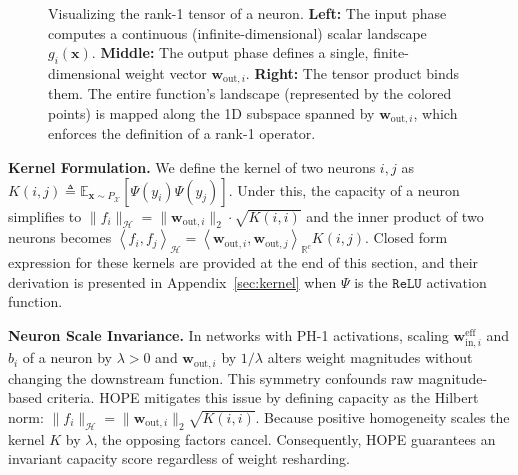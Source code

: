 \documentclass[11pt, a4paper, copyright, gdm]{google}
\newcommand{\normshort}[1]{\lVert#1\rVert}
\newcommand{\inner}[2]{\left\langle#1, #2\right\rangle}
\newcommand{\wVect}{\boldsymbol{w}}
\newcommand{\xVect}{\boldsymbol{x}}
\newcommand{\calH}{\mathcal{H}}
\newcommand{\calX}{\mathcal{X}}
\newcommand{\R}{\mathbb{R}}
\newcommand{\E}{\mathbb{E}}
\newcommand{\ReLU}{\texttt{ReLU}\xspace}
\theoremstyle{definition}
\begin{document}
\begin{figure}[tb]
{
    }
    \caption{\small Visualizing the rank-1 tensor of a neuron. \textbf{Left:} The input phase computes a continuous (infinite-dimensional) scalar landscape $g_i(\xVect)$. \textbf{Middle:} The output phase defines a single, finite-dimensional weight vector $\wVect_{\text{out}, i}$. \textbf{Right:} The tensor product binds them. The entire function's landscape (represented by the colored points) is mapped along the 1D subspace spanned by $\wVect_{\text{out}, i}$, which enforces the definition of a rank-1 operator.}
    \label{fig:tensor_synthesis}
\end{figure}

\noindent \textbf{Kernel Formulation.}
We define the kernel of two neurons $i,j$ as $K(i, j) \triangleq \E_{\xVect \sim P_{\calX}} [ \Psi(y_i) \Psi(y_j) ]$. Under this, the capacity of a neuron simplifies to $\normshort{f_i}_{\calH} = \normshort{\wVect_{\text{out},i}}_2 \cdot \sqrt{K(i, i)}$ and the inner product of two neurons becomes $\inner{f_i}{f_j}_{\calH} = \inner{\wVect_{\text{out},i}}{\wVect_{\text{out},j}}_{\R^c} K(i,j)$. Closed form expression for these kernels are provided at the end of this section, and their derivation is presented in Appendix~\ref{sec:kernel} when $\Psi$ is the $\ReLU$ activation function.

\noindent \textbf{Neuron Scale Invariance.} In networks with PH-1 activations, scaling $\wVect_{\text{in},i}^{\text{eff}}$ and $b_i$ of a neuron by $\lambda>0$ and $\wVect_{\text{out},i}$ by $1/\lambda$ alters weight magnitudes without changing the downstream function. This symmetry confounds raw magnitude-based criteria. HOPE mitigates this issue by defining capacity as the Hilbert norm: $\normshort{f_i}_{\calH} = \normshort{\wVect_{\text{out},i}}_2 \sqrt{K(i, i)}$. Because positive homogeneity scales the kernel $K$ by $\lambda$, the opposing factors cancel. Consequently, HOPE guarantees an invariant capacity score regardless of weight resharding.
\end{document}
